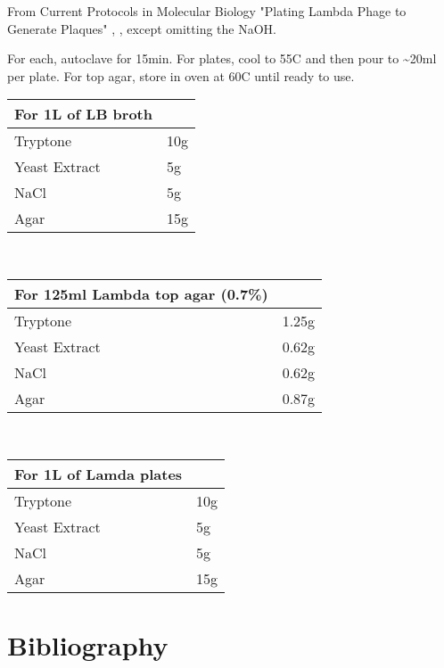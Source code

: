 \documentclass[11pt]{article}
\begin{document}
From Current Protocols in Molecular Biology "Plating Lambda Phage to Generate Plaques" \cite{lech2001}, \cite{Elbing2001}, except omitting the NaOH.

For each, autoclave for 15min. For plates, cool to 55C and then pour to \textasciitilde{}20ml per plate. For top agar, store in oven at 60C until ready to use. 

\begin{center}
\begin{tabular}{ll}
For 1L of \textbf{LB broth} & \\
\hline
Tryptone & 10g\\
Yeast Extract & 5g\\
NaCl & 5g\\
Agar & 15g\\
\end{tabular}
\end{center}

\\

\begin{center}
\begin{tabular}{ll}
For 125ml \textbf{Lambda top agar (0.7\%)} & \\
\hline
Tryptone & 1.25g\\
Yeast Extract & 0.62g\\
NaCl & 0.62g\\
Agar & 0.87g\\
\end{tabular}
\end{center}

\\

\begin{center}
\begin{tabular}{ll}
For 1L of \textbf{Lamda plates} & \\
\hline
Tryptone & 10g\\
Yeast Extract & 5g\\
NaCl & 5g\\
Agar & 15g\\
\end{tabular}
\end{center}







\section{Bibliography}
\label{sec:org3d259ce}


\end{document}
